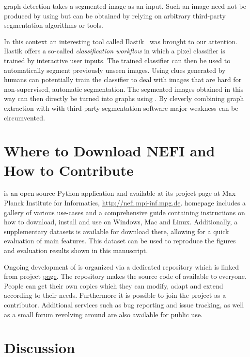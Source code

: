 		\NEFIs graph detection takes a segmented image as an input. Such an image need not be produced by using \NEFI but can be obtained by relying on arbitrary third-party segmentation algorithms or tools. 

		In this context an interesting tool called Ilastik~\cite{sommer2011ilastik} was brought to our attention. Ilastik offers a so-called \emph{classification workflow} in which a pixel classifier is trained by interactive user inputs. The trained classifier can then be used to automatically segment previously unseen images. Using clues generated by humans can potentially train the classifier to deal with images that are hard for non-supervised, automatic segmentation. The segmented images obtained in this way can then directly be turned into graphs using \NEFI. By cleverly combining \NEFIs graph extraction with with third-party segmentation software \NEFIs major weakness can be circumvented.

\section{Where to Download NEFI and How to Contribute}

	\NEFI is an open source Python application and available at its project page at Max Planck Institute for Informatics, \href{http://nefi.mpi-inf.mpg.de}{http://nefi.mpi-inf.mpg.de}. \NEFIs homepage includes a gallery of various use-cases and a comprehensive guide containing instructions on how to download, install and use \NEFI on Windows, Mac and Linux. Additionally, a supplementary datasets is available for download there, allowing for a quick evaluation of \NEFIs main features. This dataset can be used to reproduce the figures and evaluation results shown in this manuscript. 

	Ongoing development of \NEFI is organized via a dedicated repository which is linked from \NEFIs project \href{http://nefi.mpi-inf.mpg.de}{page}. The repository makes the source code of \NEFI available to everyone. People can get their own copies which they can modify, adapt and extend according to their needs. Furthermore it is possible to join the project as a contributor. Additional services such as bug reporting and issue tracking, as well as a small forum revolving around \NEFI are also available for public use.

\section{Discussion}

